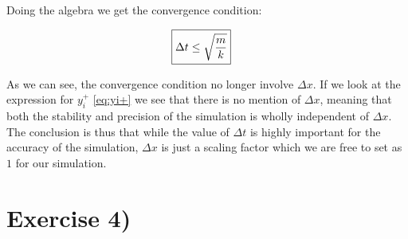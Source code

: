 \documentclass[a4paper,norsk, 10pt]{article}
\begin{document}
Doing the algebra we get the convergence condition:

\begin{align}
\Aboxed{
\Delta t \leq \sqrt{\frac{m}{k}}
}
\end{align}

As we can see, the convergence condition no longer involve $\Delta x$. If we look at the expression for $y_i^+$ \eqref{eq:yi+} we see that there is no mention of $\Delta x$, meaning that both the stability and precision of the simulation is wholly independent of $\Delta x$.\\

The conclusion is thus that while the value of $\Delta t$ is highly important for the accuracy of the simulation, $\Delta x$ is just a scaling factor which we are free to set as $1$ for our simulation.

\newpage


\section{Exercise 4)}
\end{document}
